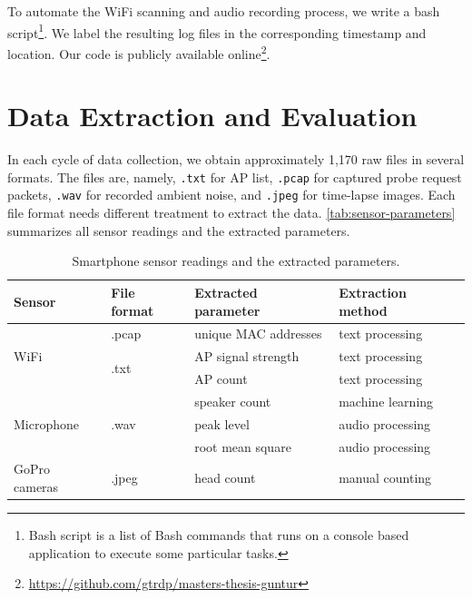 To automate the WiFi scanning and audio recording process, we write a bash script\footnote{Bash script is a list of Bash commands that runs on a console based application to execute some particular tasks.}. We label the resulting log files in the corresponding timestamp and location. Our code is publicly available online\footnote{\url{https://github.com/gtrdp/masters-thesis-guntur}}.













\section{Data Extraction and Evaluation} %
\label{sec:data_extraction_and_evaluation}
In each cycle of data collection, we obtain approximately 1,170 raw files in several formats. The files are, namely, \verb|.txt| for \ac{AP} list, \verb|.pcap| for captured probe request packets, \verb|.wav| for recorded ambient noise, and \verb|.jpeg| for time-lapse images. Each file format needs different treatment to extract the data. \autoref{tab:sensor-parameters} summarizes all sensor readings and the extracted parameters.

\begin{table}[]
\begin{adjustwidth}{-1cm}{}
\centering
\caption{Smartphone sensor readings and the extracted parameters.}
\label{tab:sensor-parameters}
\begin{tabular}{llll}\toprule
Sensor     & File format & Extracted parameter & Extraction method\\ \midrule
\multirow{3}{*}{WiFi}       & .pcap 				& unique \ac{MAC} addresses     & text processing \\
       						& \multirow{2}{*}{.txt} & \ac{AP} signal strength     & text processing \\
       						&  						& \ac{AP} count            & text processing \\ \hline
\multirow{3}{*}{Microphone} & \multirow{3}{*}{.wav} & speaker count       & machine learning \\
 							&  						& peak level          & audio processing \\
 							&  						& root mean square    & audio processing \\ \hline
GoPro cameras				& .jpeg 				& head count       & manual counting\\
\bottomrule
\end{tabular}
\end{adjustwidth}
\end{table}

